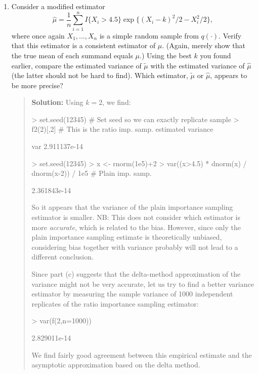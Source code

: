 \documentclass{article}
\begin{document}
\begin{enumerate}
\begin{enumerate}
      \item Consider a modified estimator 
      \[
      \hat\mu = \frac1n \sum_{i=1}^n I\{X_i>4.5\} \exp\{ (X_i-k)^2/2-X_i^2/2 \},
      \]
      where once again $X_1, \ldots, X_n$ is a simple random sample from
      $q(\cdot)$. Verify that this estimator is a consistent estimator of $\mu$.
      (Again, merely show that the true mean of each summand equals $\mu$.)
      Using the best $k$ you found earlier, compare the estimated variance of
      $\tilde\mu$ with the estimated variance of $\hat\mu$ (the latter should
      not be hard to find). Which estimator, $\tilde\mu$ or $\hat\mu$, appears
      to be more precise?
      \begin{quotation}{\bf Solution:}
      Using $k=2$, we find:
\begin{Schunk}
\begin{Sinput}
> set.seed(12345) # Set seed so we can exactly replicate sample
> f2(2)[,2] # This is the ratio imp. samp. estimated variance
\end{Sinput}
\begin{Soutput}
         var 
2.911137e-14 
\end{Soutput}
\begin{Sinput}
> set.seed(12345) 
> x <- rnorm(1e5)+2
> var((x>4.5) * dnorm(x) / dnorm(x-2)) / 1e5 # Plain imp. samp. 
\end{Sinput}
\begin{Soutput}
[1] 2.361843e-14
\end{Soutput}
\end{Schunk}
      So it appears that the variance of the plain importance sampling estimator is smaller.
      NB:  This does not consider which estimator is more {\em accurate}, which is related
      to the bias.  However, since only the plain importance sampling estimate is theoretically
      unbiased, considering bias together with variance probably will not lead to a different
      conclusion. 
      
      Since part (c) suggests that the delta-method approximation of the variance might not be 
      very accurate, let us try to find a better variance estimator by measuring the sample variance
      of 1000 independent replicates of the ratio importance sampling estimator:
\begin{Schunk}
\begin{Sinput}
> var(f(2,n=1000))
\end{Sinput}
\begin{Soutput}
[1] 2.829011e-14
\end{Soutput}
\end{Schunk}
      We find fairly good agreement between this empirical estimate and the 
      asymptotic approximation based on the delta method.
      \end{quotation}
      

\end{enumerate}
\end{enumerate}
\end{document}
